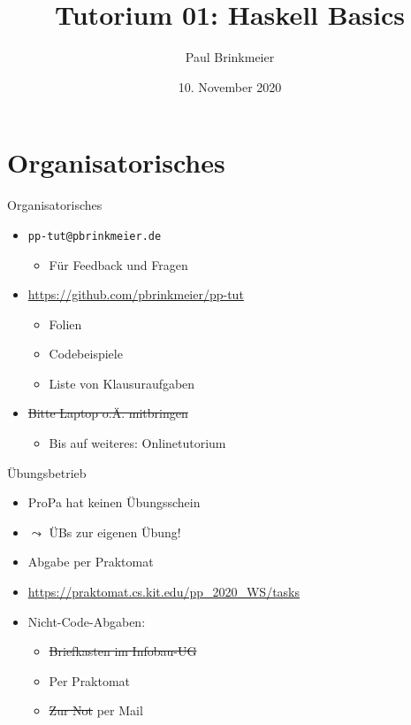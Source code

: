 \documentclass{beamer}
\title{Tutorium 01: Haskell Basics}
\author{Paul Brinkmeier}
\institute{Tutorium Programmierparadigmen am KIT}
\date{10. November 2020}
\begin{document}
\begin{frame}
	\titlepage
\end{frame}

\section{Organisatorisches}

\begin{frame}{Organisatorisches}
	\begin{itemize}
		\item \texttt{pp-tut@pbrinkmeier.de}
		\begin{itemize}
			\item Für Feedback und Fragen
		\end{itemize}
		\item \url{https://github.com/pbrinkmeier/pp-tut}
		\begin{itemize}
			\item Folien
			\item Codebeispiele
                        \item Liste von Klausuraufgaben
		\end{itemize}
                \item \sout{Bitte Laptop o.Ä. mitbringen}
                \begin{itemize}
                    \item Bis auf weiteres: Onlinetutorium
                \end{itemize}
	\end{itemize}
\end{frame}

\begin{frame}{Übungsbetrieb}
	\begin{itemize}
		\item ProPa hat keinen Übungsschein
		\item $\leadsto$ ÜBs zur eigenen Übung!
		\item Abgabe per Praktomat
		\item \url{https://praktomat.cs.kit.edu/pp_2020_WS/tasks}
		\item Nicht-Code-Abgaben:
		\begin{itemize}
                    \item \sout{Briefkasten im Infobau-UG}
                    \item Per Praktomat
                    \item \sout{Zur Not} per Mail
		\end{itemize}
	\end{itemize}
\end{frame}
\end{document}
